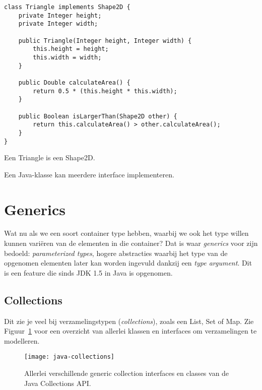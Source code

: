 \documentclass[dutch,a4paper,12pt,doubleside]{book}
\begin{document}
\begin{listing}[H]
\begin{verbatim}
class Triangle implements Shape2D {
    private Integer height;
    private Integer width;

    public Triangle(Integer height, Integer width) {
        this.height = height;
        this.width = width;
    }

    public Double calculateArea() {
        return 0.5 * (this.height * this.width);
    }

    public Boolean isLargerThan(Shape2D other) {
        return this.calculateArea() > other.calculateArea();
    }
}
\end{verbatim}
\caption{Een Triangle is een Shape2D.}
\label{code:triangle}
\end{listing}

Een Java-klasse kan meerdere interface implementeren.

\section{Generics}
Wat nu als we een soort container type hebben, waarbij we 
ook het type willen kunnen variëren van de elementen in die container?
Dat is waar \textit{generics} voor zijn bedoeld: \textit{parameterized types}, 
hogere abstracties waarbij het type van de 
opgenomen elementen later kan worden ingevuld dankzij een \textit{type argument}.
Dit is een feature die sinds JDK 1.5 in Java is opgenomen.

\subsection{Collections}
Dit zie je veel bij verzamelingstypen (\textit{collections}), zoals een List, Set of Map.
Zie Figuur~\ref{fig:java-collections} voor een overzicht van allerlei klassen en interfaces
om verzamelingen te modelleren.

\begin{figure}[H]
    \centering
    \texttt{[image: java-collections]}
    \caption{Allerlei verschillende generic collection interfaces en classes van de Java Collections API.}
    \label{fig:java-collections}
\end{figure}
\end{document}
